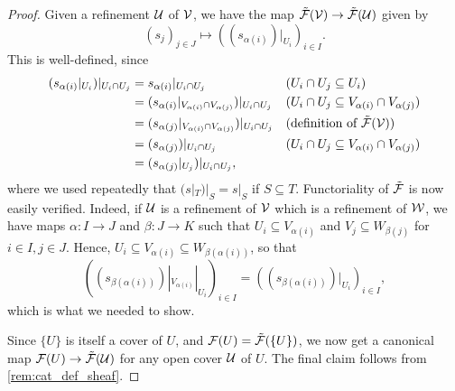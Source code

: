\documentclass{article}
\begin{document}
\begin{proof}
    Given a refinement $\mathcal{U}$ of $\mathcal{V}$, we have the map
    $\tilde{\mathcal{F}}(\mathcal{V}) \to \tilde{\mathcal{F}}(\mathcal{U})$ given by
    \begin{equation*}
        (s_j)_{j\in J} \mapsto ((s_{\alpha(i)})|_{U_i})_{i\in I}.
    \end{equation*}
    This is well-defined, since
    \begin{align*}
        (s_{\alpha(i)}|_{U_i})|_{U_i \cap U_j}
         & = s_{\alpha(i)}|_{U_i \cap U_j}
         &                                                      & (U_i \cap U_j \subseteq U_i)                              \\
         & = (s_{\alpha(i)}|_{V_{\alpha(i)}\cap V_{\alpha(j)}})
        |_{U_i \cap U_j}
         &                                                      & (U_i \cap U_j \subseteq V_{\alpha(i)} \cap V_{\alpha(j)}) \\
         & = (s_{\alpha(j)}|_{V_{\alpha(i)}\cap V_{\alpha(j)}})
        |_{U_i \cap U_j}
         &                                                      & (\text{definition of } \tilde{\mathcal{F}}(\mathcal{V}))                \\
         & = (s_{\alpha(j)})|_{U_i \cap U_j}
         &                                                      & (U_i \cap U_j \subseteq V_{\alpha(i)} \cap V_{\alpha(j)}) \\
         & = (s_{\alpha(j)}|_{U_j})|_{U_i \cap U_j},
    \end{align*}
    where we used repeatedly that $(s|_{T})|_{S} = s|_{S}$ if $S\subseteq T$.
    Functoriality of $\tilde{\mathcal{F}}$ is now easily verified.
    Indeed, if $\mathcal{U}$ is a refinement of $\mathcal{V}$ which is a refinement
    of $\mathcal{W}$, we have maps $\alpha\colon I \to J$ and $\beta \colon J \to K$
    such that $U_i \subseteq V_{\alpha(i)}$ and $V_j \subseteq W_{\beta(j)}$
    for $i\in I, j\in J$. Hence, $U_i \subseteq V_{\alpha(i)} \subseteq W_{\beta(\alpha(i))}$,
    so that
    \begin{equation*}
        ((s_{\beta(\alpha(i))})|_{V_{\alpha(i)}}|_{U_i})_{i\in I}
        = ((s_{\beta(\alpha(i))})|_{U_i})_{i\in I} ,
    \end{equation*}
    which is what we needed to show.

    Since $\{U\}$ is itself a cover of $U$, and $\mathcal{F}(U) = \tilde{\mathcal{F}}(\{U\})$,
    we now get a canonical map $\mathcal{F}(U) \to \tilde{\mathcal{F}}(\mathcal{U})$ for any open cover
    $\mathcal{U}$ of $U$. The final claim follows from \cref{rem:cat_def_sheaf}.
\end{proof}
\end{document}
